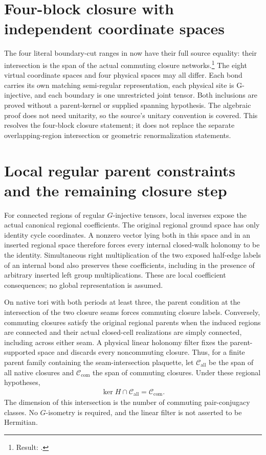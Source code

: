 \documentclass{article}
\begin{document}
\section{Four-block closure with independent coordinate spaces}
The four literal boundary-cut ranges in
\cite[Theorem~5.5]{Schuch2010PEPS} now have their full source equality:
their intersection is the span of the actual commuting closure networks.\footnote{Result:
    .}
The eight virtual coordinate spaces and four physical spaces may all differ.
Each bond carries its own matching semi-regular representation, each physical
site is G-injective, and each boundary is one unrestricted joint tensor.
Both inclusions are proved without a parent-kernel or supplied spanning
hypothesis. The algebraic proof does not need unitarity, so the source's unitary
convention is covered. This resolves the four-block closure statement; it does
not replace the separate overlapping-region intersection or geometric
renormalization statements.

\section{Local regular parent constraints and the remaining closure step}
For connected regions of regular $G$-injective tensors, local inverses expose the actual
canonical regional coefficients. The original regional ground space
has only identity cycle coordinates. A nonzero vector lying both in
this space and in an inserted regional space therefore forces every
internal closed-walk holonomy to be the identity. Simultaneous right
multiplication of the two exposed half-edge labels of an internal
bond also preserves these coefficients, including in the presence of
arbitrary inserted left group multiplications. These are local
coefficient consequences; no global representation is assumed.

On native tori with both periods at least three, the parent condition
at the intersection of the two closure seams forces commuting closure
labels. Conversely, commuting closures satisfy the original regional
parents when the induced regions are connected and their actual
closed-cell realizations are simply connected, including across either
seam. A physical linear holonomy filter fixes the parent-supported
space and discards every noncommuting closure. Thus, for a finite
parent family containing the seam-intersection plaquette, let
$\mathcal C_{\mathrm{all}}$ be the span of all native closures and
$\mathcal C_{\mathrm{com}}$ the span of commuting closures. Under
these regional hypotheses,
\begin{align}
    \ker H\cap\mathcal C_{\mathrm{all}}
        =\mathcal C_{\mathrm{com}}.
\end{align}
The dimension of this intersection is the number of commuting
pair-conjugacy classes. No $G$-isometry is required, and the linear
filter is not asserted to be Hermitian.
\end{document}
